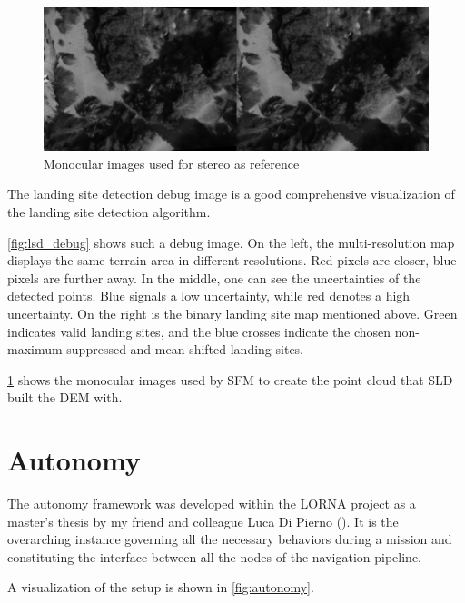 \begin{figure}[ht!]
    \centering
    \includegraphics[scale=0.28]{images/system_overview/Flagship_ref.png}
    \caption{Monocular images used for stereo as reference}
    \label{fig:lsd_debug_ref}
\end{figure}

The landing site detection debug image is a good comprehensive visualization of the landing site detection algorithm. 

\cref{fig:lsd_debug} shows such a debug image. On the left, the multi-resolution map displays the same terrain area in different resolutions. Red pixels are closer, blue pixels are further away. In the middle, one can see the uncertainties of the detected points. Blue signals a low uncertainty, while red denotes a high uncertainty. On the right is the binary landing site map mentioned above. Green indicates valid landing sites, and the blue crosses indicate the chosen non-maximum suppressed and mean-shifted landing sites.   

\cref{fig:lsd_debug_ref} shows the monocular images used by SFM to create the point cloud that SLD built the DEM with.
\clearpage %

\section{Autonomy}\label{sec:setup:autonomy}

The autonomy framework was developed within the LORNA project as a master's thesis by my friend and colleague Luca Di Pierno (\citep{Autonomy}). It is the overarching instance governing all the necessary behaviors during a mission and constituting the interface between all the nodes of the navigation pipeline.

A visualization of the setup is shown in \cref{fig:autonomy}.

